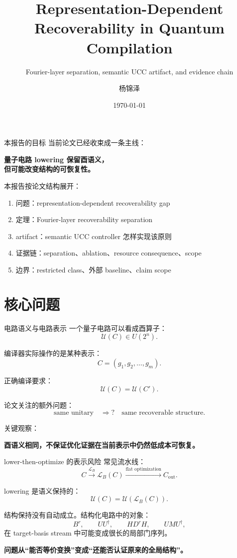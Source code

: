 \documentclass[aspectratio=169,11pt]{ctexbeamer}
\title{Representation-Dependent Recoverability in Quantum Compilation}
\subtitle{Fourier-layer separation, semantic UCC artifact, and evidence chain}
\author{杨锦泽}
\date{\today}
\newcommand{\basis}{\mathcal{L}_B}
\newcommand{\sem}[1]{\mathcal{U}(#1)}
\begin{document}
\begin{frame}
  \titlepage
\end{frame}

\begin{frame}{本报告的目标}
  当前论文已经收束成一条主线：

  \begin{center}
    \Large
    \textbf{量子电路 lowering 保留酉语义，}\\
    \textbf{但可能改变结构的可恢复性。}
  \end{center}

  \vspace{0.8em}
  本报告按论文结构展开：

  \begin{enumerate}
    \item 问题：representation-dependent recoverability gap
    \item 定理：Fourier-layer recoverability separation
    \item artifact：semantic UCC controller 怎样实现该原则
    \item 证据链：separation、ablation、resource consequence、scope
    \item 边界：restricted class、外部 baseline、claim scope
  \end{enumerate}
\end{frame}

\tableofcontents

\section{核心问题}

\begin{frame}{电路语义与电路表示}
  一个量子电路可以看成酉算子：
  \[
    \sem{C}\in U(2^n).
  \]

  编译器实际操作的是某种表示：
  \[
    C=(g_1,g_2,\ldots,g_m).
  \]

  正确编译要求：
  \[
    \sem{C}=\sem{C'}.
  \]

  论文关注的额外问题：
  \[
    \text{same unitary}
    \quad\Longrightarrow?\quad
    \text{same recoverable structure}.
  \]

  关键观察：
  \begin{center}
    \textbf{酉语义相同，不保证优化证据在当前表示中仍然低成本可恢复。}
  \end{center}
\end{frame}

\begin{frame}{lower-then-optimize 的表示风险}
  常见流水线：
  \[
    C
    \xrightarrow{\basis}
    \basis(C)
    \xrightarrow{\text{flat optimization}}
    C_{\mathrm{out}}.
  \]

  lowering 是语义保持的：
  \[
    \sem{C}=\sem{\basis(C)}.
  \]

  结构保持没有自动成立。结构化电路中的对象：
  \[
    B^r,\qquad U U^\dagger,\qquad H D^r H,\qquad U M U^\dagger,
  \]
  在 target-basis stream 中可能变成很长的局部门序列。

  \begin{center}
    \textbf{问题从“能否等价变换”变成“还能否认证原来的全局结构”。}
  \end{center}
\end{frame}
\end{document}
